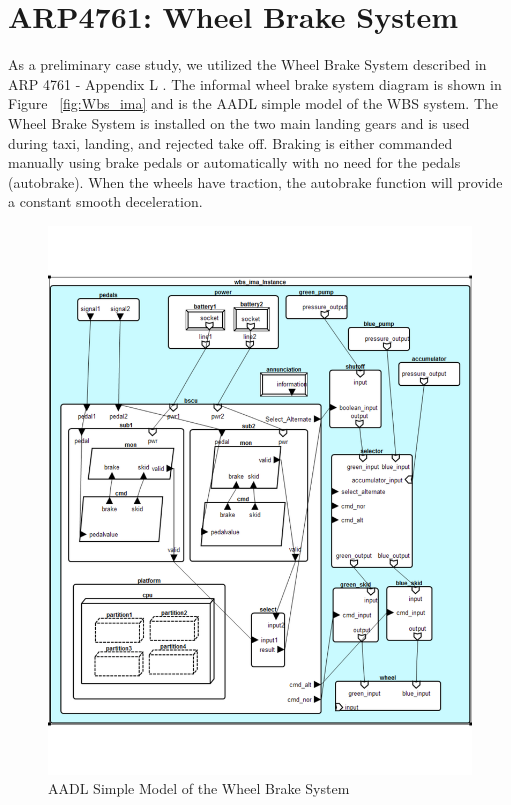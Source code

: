 \section{ARP4761: Wheel Brake System}

As a preliminary case study, we utilized the Wheel Brake System described in ARP 4761 - Appendix L \cite{AIR6110}. The informal wheel brake system diagram is shown in Figure ~\ref{fig:Wbs_ima} and is the AADL simple model of the WBS system. The Wheel Brake System is installed on the two main landing gears and is used during taxi, landing, and rejected take off. Braking is either commanded manually using brake pedals or automatically with no need for the pedals (autobrake). When the wheels have traction, the autobrake function will provide a constant smooth deceleration. \\


\begin{figure}[htb]
\begin{center}
\includegraphics[scale=.5]{images/Wbs-ima}
\caption{AADL Simple Model of the Wheel Brake System }\label{fig:wbs_ima}
\end{center}
\end{figure}

